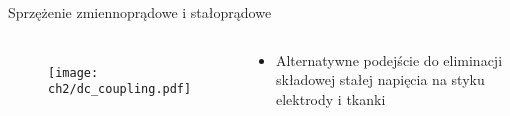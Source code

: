 \begin{frame}{Sprzężenie zmiennoprądowe i stałoprądowe}
\begin{columns}
        \vspace{-3em} %

        \begin{figure}[H]
            \centering
            \texttt{[image: ch2/dc\_coupling.pdf]}
        \end{figure}


    {\renewcommand\normalsize{\small}%
    \normalsize
    \vspace{-1em} %

        \begin{alertblock}{}

        \begin{itemize}
            \item Alternatywne podejście do eliminacji składowej stałej napięcia na styku elektrody i tkanki
        \end{itemize}
    \end{alertblock}
    }

    \end{columns}

\end{frame}
